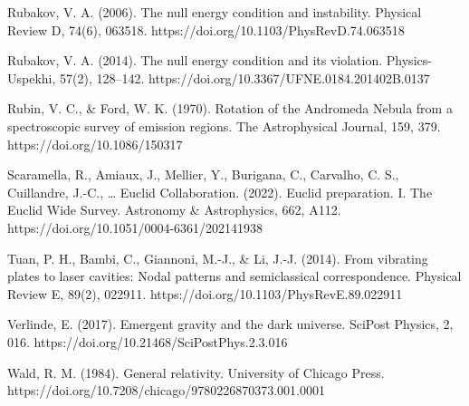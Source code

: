 \documentclass[11pt]{article}
\begin{document}
Rubakov, V. A. (2006). The null energy condition and instability. Physical Review D, 74(6), 063518. https://doi.org/10.1103/PhysRevD.74.063518

Rubakov, V. A. (2014). The null energy condition and its violation. Physics-Uspekhi, 57(2), 128--142. https://doi.org/10.3367/UFNE.0184.201402B.0137

Rubin, V. C., \& Ford, W. K. (1970). Rotation of the Andromeda Nebula from a spectroscopic survey of emission regions. The Astrophysical Journal, 159, 379. https://doi.org/10.1086/150317

Scaramella, R., Amiaux, J., Mellier, Y., Burigana, C., Carvalho, C. S., Cuillandre, J.-C., \ldots{} Euclid Collaboration. (2022). Euclid preparation. I. The Euclid Wide Survey. Astronomy \& Astrophysics, 662, A112. https://doi.org/10.1051/0004-6361/202141938

Tuan, P. H., Bambi, C., Giannoni, M.-J., \& Li, J.-J. (2014). From vibrating plates to laser cavities: Nodal patterns and semiclassical correspondence. Physical Review E, 89(2), 022911. https://doi.org/10.1103/PhysRevE.89.022911

Verlinde, E. (2017). Emergent gravity and the dark universe. SciPost Physics, 2, 016. https://doi.org/10.21468/SciPostPhys.2.3.016

Wald, R. M. (1984). General relativity. University of Chicago Press. https://doi.org/10.7208/chicago/9780226870373.001.0001
\fi
\end{document}
